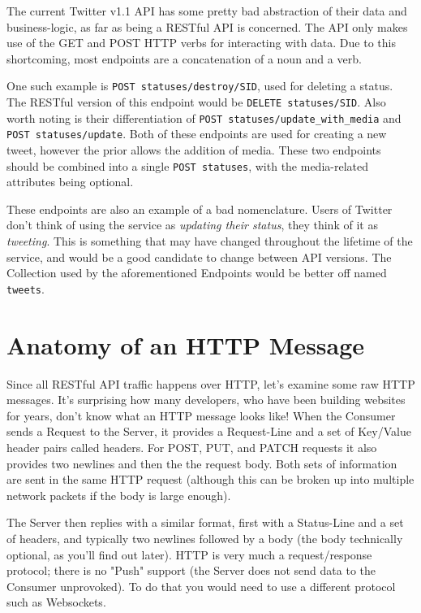 \documentclass{book}
\begin{document}
The current Twitter v1.1 API \cite{TWITTERAPI} has some pretty bad abstraction of their data and business-logic, as far as being a RESTful API is concerned. The API only makes use of the GET and POST HTTP verbs for interacting with data. Due to this shortcoming, most endpoints are a concatenation of a noun and a verb.

One such example is \texttt{POST statuses/destroy/SID}, used for deleting a status. The RESTful version of this endpoint would be \texttt{DELETE statuses/SID}. Also worth noting is their differentiation of \texttt{POST statuses/update\_with\_media} and \texttt{POST statuses/update}. Both of these endpoints are used for creating a new tweet, however the prior allows the addition of media. These two endpoints should be combined into a single \texttt{POST statuses}, with the media-related attributes being optional.

These endpoints are also an example of a bad nomenclature. Users of Twitter don't think of using the service as \emph{updating their status}, they think of it as \emph{tweeting}. This is something that may have changed throughout the lifetime of the service, and would be a good candidate to change between API versions. The Collection used by the aforementioned Endpoints would be better off named \texttt{tweets}.


\section{Anatomy of an HTTP Message}

Since all RESTful API traffic happens over HTTP, let's examine some raw HTTP messages. It's surprising how many developers, who have been building websites for years, don't know what an HTTP message looks like! When the Consumer sends a Request to the Server, it provides a Request-Line and a set of Key/Value header pairs called headers. For POST, PUT, and PATCH requests it also provides two newlines and then the the request body. Both sets of information are sent in the same HTTP request (although this can be broken up into multiple network packets if the body is large enough).

The Server then replies with a similar format, first with a Status-Line and a set of headers, and typically two newlines followed by a body (the body technically optional, as you'll find out later). HTTP is very much a request/response protocol; there is no "Push" support (the Server does not send data to the Consumer unprovoked). To do that you would need to use a different protocol such as Websockets.
\end{document}
